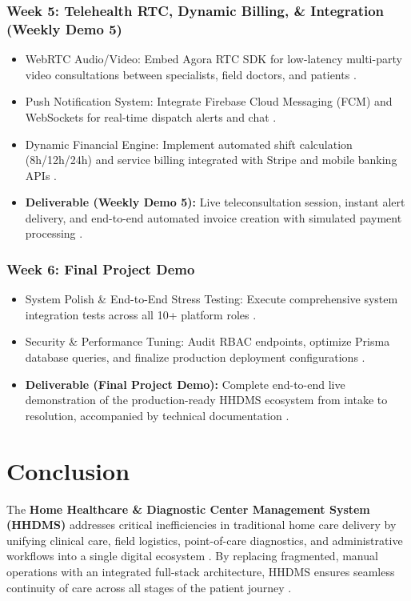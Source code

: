 \documentclass[lettersize,onecolumn,journal]{IEEEtran}
\begin{document}
	\subsubsection{Week 5: Telehealth RTC, Dynamic Billing, \& Integration (Weekly Demo 5)}
	\begin{itemize}
		\item WebRTC Audio/Video: Embed Agora RTC SDK for low-latency multi-party video consultations between specialists, field doctors, and patients \cite{agorawebrtc}.
		\item Push Notification System: Integrate Firebase Cloud Messaging (FCM) and WebSockets for real-time dispatch alerts and chat \cite{fette2011websocket}.
		\item Dynamic Financial Engine: Implement automated shift calculation (8h/12h/24h) and service billing integrated with Stripe and mobile banking APIs \cite{stripe2024api}.
		\item \textbf{Deliverable (Weekly Demo 5):} Live teleconsultation session, instant alert delivery, and end-to-end automated invoice creation with simulated payment processing \cite{agorawebrtc, stripe2024api}.
	\end{itemize}
	
	\subsubsection{Week 6: Final Project Demo}
	\begin{itemize}
		\item System Polish \& End-to-End Stress Testing: Execute comprehensive system integration tests across all 10+ platform roles \cite{srs2026}.
		\item Security \& Performance Tuning: Audit RBAC endpoints, optimize Prisma database queries, and finalize production deployment configurations \cite{rbac_standard, nestjs_framework}.
		\item \textbf{Deliverable (Final Project Demo):} Complete end-to-end live demonstration of the production-ready HHDMS ecosystem from intake to resolution, accompanied by technical documentation \cite{srs2026}.
	\end{itemize}
	
	\section{Conclusion}
	
	The \textbf{Home Healthcare \& Diagnostic Center Management System (HHDMS)} addresses critical inefficiencies in traditional home care delivery by unifying clinical care, field logistics, point-of-care diagnostics, and administrative workflows into a single digital ecosystem \cite{srs2026}. By replacing fragmented, manual operations with an integrated full-stack architecture, HHDMS ensures seamless continuity of care across all stages of the patient journey \cite{srs2026, accv2016}.
	
\end{document}
